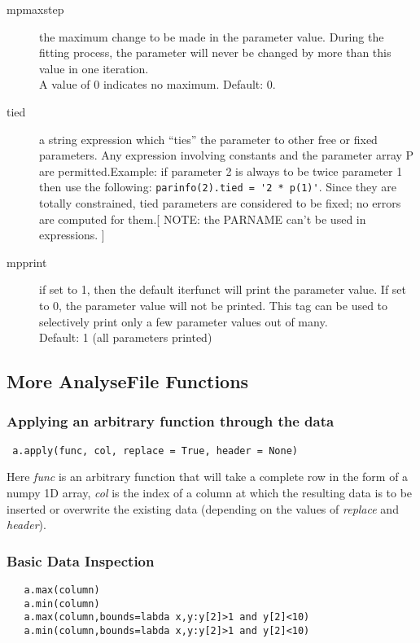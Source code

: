 \documentclass[a4paper,11pt]{scrartcl}
\begin{document}
\begin{description}
  \item[mpmaxstep] the maximum change to be made in the parameter value.  During
the fitting process, the parameter will never be changed by more than this value
in one iteration.\\ A value of 0 indicates no maximum.  Default: 0.
  \item[tied] a string expression which ``ties'' the parameter to other	free or
fixed parameters.  Any expression involving	constants and the parameter
array P are permitted.Example: if parameter 2 is always to be twice parameter 1
then use the following: \verb#parinfo(2).tied = '2 * p(1)'#. Since they are
totally constrained, tied parameters are considered to be fixed; no errors are
computed for them.[ NOTE: the PARNAME can't be used in expressions. ]
  \item[mpprint] if set to 1, then the default iterfunct will print the
parameter value.  If set to 0, the parameter value will not be printed.  This
tag can be used to selectively print only a few parameter values out of
many.\\Default: 1 (all parameters printed)
\end{description}

\subsection{More AnalyseFile Functions}

\subsubsection{Applying an arbitrary function through the data}

\begin{lstlisting}
 a.apply(func, col, replace = True, header = None)
\end{lstlisting}

Here \textit{func} is an arbitrary function that will take a complete row in the form of a numpy 1D array, \textit{col}
is the index of a column at which the resulting data is to be inserted or overwrite the existing data (depending on the values of \textit{replace} and \textit{header}).


\subsubsection{Basic Data Inspection}
\begin{lstlisting}
   a.max(column)
   a.min(column)
   a.max(column,bounds=labda x,y:y[2]>1 and y[2]<10)
   a.min(column,bounds=labda x,y:y[2]>1 and y[2]<10)
\end{lstlisting}
\end{document}
